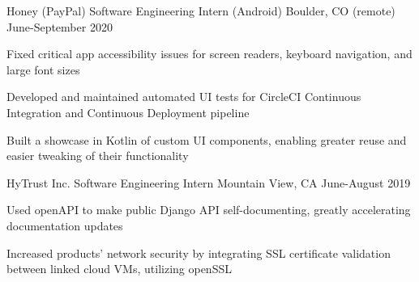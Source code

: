 \documentclass[12pt, a4paper]{awesome-cv}
\begin{document}
\makecvheader


\begin{cventries}

  \cventry
    {Honey (PayPal)}
    {Software Engineering Intern (Android)}
    {Boulder, CO (remote)}
    {June-September 2020}
    {
        \begin{cvitems}
            \item {Fixed critical app accessibility issues for screen readers, keyboard navigation, and large font sizes}
            \item {Developed and maintained automated UI tests for CircleCI Continuous Integration and Continuous Deployment pipeline}
            \item {Built a showcase in Kotlin of custom UI components, enabling greater reuse and easier tweaking of their functionality}
        \end{cvitems}
    }

  \cventry
    {HyTrust Inc.}
    {Software Engineering Intern}
    {Mountain View, CA}
    {June-August 2019}
    {
      \begin{cvitems}
      	\item {Used openAPI to make public Django API self-documenting, greatly accelerating documentation updates}
	      \item {Increased products' network security by integrating SSL certificate validation between linked cloud VMs, utilizing openSSL}
      \end{cvitems}
    }




\end{cventries}
\end{document}
